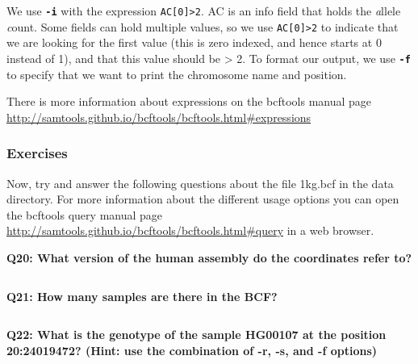 \documentclass[11pt]{article}
\makeatletter
\newcommand{\boxspacing}{\kern\kvtcb@left@rule\kern\kvtcb@boxsep}
\newcommand{\prompt}[4]{
        {\ttfamily\llap{{\color{blue}\LARGE\faKeyboardO\hspace{3pt}#4}}\vspace{-\baselineskip}}
    }
\makeatother
\begin{document}
    We use \textbf{\texttt{-i}} with the expression
\texttt{AC{[}0{]}\textgreater{}2}. AC is an info field that holds the
\emph{a}llele \emph{c}ount. Some fields can hold multiple values, so
we use \texttt{AC{[}0{]}\textgreater{}2} to indicate that we are looking
for the first value (this is zero indexed, and hence starts at 0 instead
of 1), and that this value should be \textgreater{} 2. To format our
output, we use \textbf{\texttt{-f}} to specify that we want to print the
chromosome name and position.

There is more information about expressions on the bcftools manual page
\url{http://samtools.github.io/bcftools/bcftools.html\#expressions}

    \hypertarget{exercises}{%
\subsubsection{Exercises}\label{exercises}}

Now, try and answer the following questions about the file 1kg.bcf in
the data directory. For more information about the different usage
options you can open the bcftools query manual page
\url{http://samtools.github.io/bcftools/bcftools.html\#query} in a web
browser.

    \textbf{Q20: What version of the human assembly do the coordinates refer
to?}

    \begin{tcolorbox}[breakable, size=fbox, boxrule=1pt, pad at break*=1mm,colback=cellbackground, colframe=cellborder]
\prompt{In}{incolor}{ }{\boxspacing}
\begin{Verbatim}[commandchars=\\\{\}]

\end{Verbatim}
\end{tcolorbox}

    \textbf{Q21: How many samples are there in the BCF?}

    \begin{tcolorbox}[breakable, size=fbox, boxrule=1pt, pad at break*=1mm,colback=cellbackground, colframe=cellborder]
\prompt{In}{incolor}{ }{\boxspacing}
\begin{Verbatim}[commandchars=\\\{\}]

\end{Verbatim}
\end{tcolorbox}

    \textbf{Q22: What is the genotype of the sample HG00107 at the position
20:24019472? (Hint: use the combination of -r, -s, and -f options)}
\end{document}
